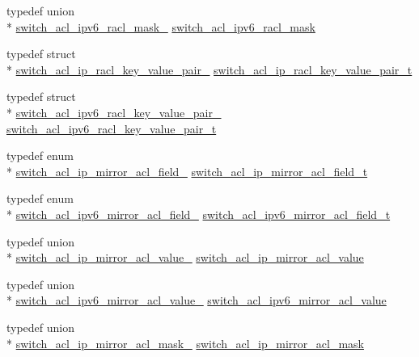 \begin{DoxyCompactItemize}
\item 
typedef union \\*
\hyperlink{unionswitch__acl__ipv6__racl__mask__}{switch\+\_\+acl\+\_\+ipv6\+\_\+racl\+\_\+mask\+\_\+} \hyperlink{group__ACL_gaf31d1e6d533306d0c84eff01b351db3b}{switch\+\_\+acl\+\_\+ipv6\+\_\+racl\+\_\+mask}
\item 
typedef struct \\*
\hyperlink{structswitch__acl__ip__racl__key__value__pair__}{switch\+\_\+acl\+\_\+ip\+\_\+racl\+\_\+key\+\_\+value\+\_\+pair\+\_\+} \hyperlink{group__ACL_ga02d0e84a928a23afab14c72de0d6759a}{switch\+\_\+acl\+\_\+ip\+\_\+racl\+\_\+key\+\_\+value\+\_\+pair\+\_\+t}
\item 
typedef struct \\*
\hyperlink{structswitch__acl__ipv6__racl__key__value__pair__}{switch\+\_\+acl\+\_\+ipv6\+\_\+racl\+\_\+key\+\_\+value\+\_\+pair\+\_\+} \hyperlink{group__ACL_ga924b4f1df16c9650642cdaf87a515030}{switch\+\_\+acl\+\_\+ipv6\+\_\+racl\+\_\+key\+\_\+value\+\_\+pair\+\_\+t}
\item 
typedef enum \\*
\hyperlink{group__ACL_gaceebbef0581567ba589780ab1457b6ad}{switch\+\_\+acl\+\_\+ip\+\_\+mirror\+\_\+acl\+\_\+field\+\_\+} \hyperlink{group__ACL_ga6b1c3fc9bbdc06497cada468a2dfa1f0}{switch\+\_\+acl\+\_\+ip\+\_\+mirror\+\_\+acl\+\_\+field\+\_\+t}
\item 
typedef enum \\*
\hyperlink{group__ACL_ga96ba930bcd7e5a7141dcf7fb136fd2c8}{switch\+\_\+acl\+\_\+ipv6\+\_\+mirror\+\_\+acl\+\_\+field\+\_\+} \hyperlink{group__ACL_gaae7e0c4f916d7237b7ebbdd8d6608110}{switch\+\_\+acl\+\_\+ipv6\+\_\+mirror\+\_\+acl\+\_\+field\+\_\+t}
\item 
typedef union \\*
\hyperlink{unionswitch__acl__ip__mirror__acl__value__}{switch\+\_\+acl\+\_\+ip\+\_\+mirror\+\_\+acl\+\_\+value\+\_\+} \hyperlink{group__ACL_gaab3f7b11b6bb86c122f1c7dfa48d8753}{switch\+\_\+acl\+\_\+ip\+\_\+mirror\+\_\+acl\+\_\+value}
\item 
typedef union \\*
\hyperlink{unionswitch__acl__ipv6__mirror__acl__value__}{switch\+\_\+acl\+\_\+ipv6\+\_\+mirror\+\_\+acl\+\_\+value\+\_\+} \hyperlink{group__ACL_gaaab3094c60472f1d2498b7da60715bd7}{switch\+\_\+acl\+\_\+ipv6\+\_\+mirror\+\_\+acl\+\_\+value}
\item 
typedef union \\*
\hyperlink{unionswitch__acl__ip__mirror__acl__mask__}{switch\+\_\+acl\+\_\+ip\+\_\+mirror\+\_\+acl\+\_\+mask\+\_\+} \hyperlink{group__ACL_ga846b6479df0e1a11dcc41e565b44abfb}{switch\+\_\+acl\+\_\+ip\+\_\+mirror\+\_\+acl\+\_\+mask}

\end{DoxyCompactItemize}
